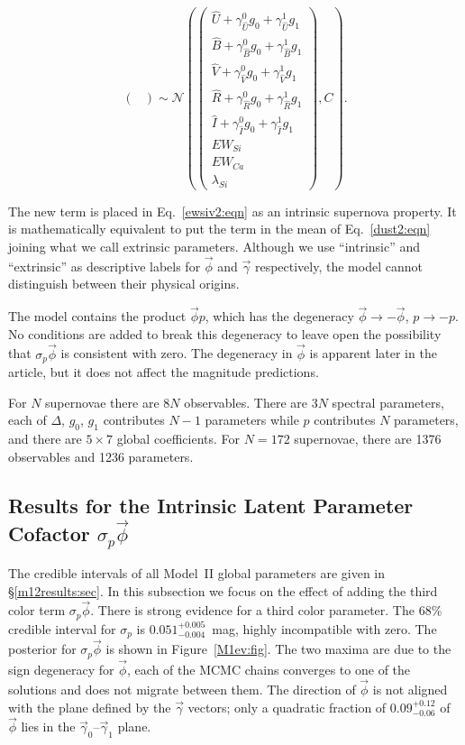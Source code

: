 \documentclass[trackchanges]{aastex61}   	%
\begin{document}
{\begin{equation}
\begin{pmatrix}
\end{pmatrix}
\sim \mathcal{N}
\left(
\begin{pmatrix}
{\hat{U}} +\gamma^0_{{\hat{U}}} g_0 +\gamma^1_{{\hat{U}}} g_1 \\{\hat{B}} +\gamma^0_{{\hat{B}}} g_0 +\gamma^1_{{\hat{B}}} g_1 \\
{\hat{V}}+\gamma^0_{{\hat{V}}} g_0+\gamma^1_{{\hat{V}}} g_1\\{\hat{R}}+\gamma^0_{{\hat{R}}} g_0 + \gamma^1_{{\hat{R}}} g_1\\{\hat{I}}+\gamma^0_{{\hat{I}}} g_0+\gamma^1_{{\hat{I}}} g_1\\
EW_{Si}\\ EW_{Ca} \\ \lambda_{Si}
\end{pmatrix}
,C
\right).
\label{dust2:eqn}
\end{equation}


The new term is placed in Eq.~\ref{ewsiv2:eqn} as an intrinsic supernova property.  It is mathematically equivalent to
put the term in the mean of Eq.~\ref{dust2:eqn} joining what we call extrinsic parameters.  Although we 
use ``intrinsic'' and ``extrinsic'' as descriptive labels for $\vec{\phi}$ and $\vec{\gamma}$ respectively, the model cannot distinguish between
their physical origins.

The model contains the product 
$\vec{\phi} p$, which has the degeneracy $\vec{\phi} \rightarrow -\vec{\phi}$, $p \rightarrow -p$.
No conditions are added to break this degeneracy to leave open the possibility that
$\sigma_p\vec{\phi}$ is consistent with zero.  The degeneracy
in $\vec{\phi}$ is apparent later in the article, but it does not affect the magnitude predictions.

For $N$ supernovae there are $8N$ observables.  There are $3N$ spectral parameters, each of
$\Delta$, $g_0$, $g_1$ contributes $N-1$ parameters while $p$  contributes $N$ parameters,  and  there are $5 \times 7$ global coefficients.
For $N=172$ supernovae, there are 1376 observables and 1236  parameters.

\subsection{Results for the Intrinsic Latent Parameter Cofactor $\sigma_p \vec{\phi}$}
\label{results2:sec}
The credible intervals of all Model~II global parameters are given in  \S\ref{m12results:sec}.
In this subsection we focus on the effect of adding the third color term  $\sigma_p \vec{\phi}$.
There is strong evidence for a third color parameter.
The 68\% credible interval for $\sigma_p$ is $0.051^{+0.005}_{-0.004}$~mag, highly incompatible with zero. 
The posterior for $\sigma_p \vec{\phi}$ is shown in Figure~\ref{M1ev:fig}.  
The two maxima are due to the sign degeneracy for $\vec{\phi}$, each of the MCMC chains converges to one of the solutions and does
not migrate between them.
The direction of $\vec{\phi}$ is not aligned with the plane defined by
the $\vec{\gamma}$ vectors; only a quadratic fraction of
 $0.09^{+0.12}_{-0.06}$ of 
 $\vec{\phi}$ lies in the $\vec{\gamma}_0$--$\vec{\gamma}_1$ plane.

}
\end{document}
